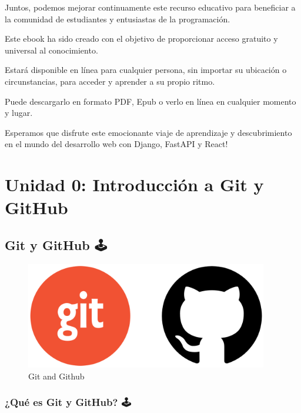 \documentclass[
  a4paper,
  DIV=11,
  numbers=noendperiod,
  onepage,
  openany]{scrreprt}
\begin{document}
Juntos, podemos mejorar continuamente este recurso educativo para
beneficiar a la comunidad de estudiantes y entusiastas de la
programación.

Este ebook ha sido creado con el objetivo de proporcionar acceso
gratuito y universal al conocimiento.

Estará disponible en línea para cualquier persona, sin importar su
ubicación o circunstancias, para acceder y aprender a su propio ritmo.

Puede descargarlo en formato PDF, Epub o verlo en línea en cualquier
momento y lugar.

Esperamos que disfrute este emocionante viaje de aprendizaje y
descubrimiento en el mundo del desarrollo web con Django, FastAPI y
React!

\part{Unidad 0: Introducción a Git y GitHub}

\chapter{Git y GitHub 🕹️}\label{git-y-github}

\begin{figure}[H]

{\centering \includegraphics[width=4.16667in,height=\textheight]{unidades/unidad0/../../images/git_and_github.png}

}

\caption{Git and Github}

\end{figure}%

\section{¿Qué es Git y GitHub? 🕹️}\label{quuxe9-es-git-y-github}
\end{document}
